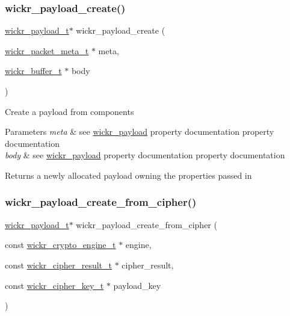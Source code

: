 \subsubsection{\texorpdfstring{wickr\+\_\+payload\+\_\+create()}{wickr\_payload\_create()}}
{\footnotesize\ttfamily \mbox{\hyperlink{structwickr__payload}{wickr\+\_\+payload\+\_\+t}}$\ast$ wickr\+\_\+payload\+\_\+create (\begin{DoxyParamCaption}\item[{\mbox{\hyperlink{structwickr__packet__meta}{wickr\+\_\+packet\+\_\+meta\+\_\+t}} $\ast$}]{meta,  }\item[{\mbox{\hyperlink{structwickr__buffer}{wickr\+\_\+buffer\+\_\+t}} $\ast$}]{body }\end{DoxyParamCaption})}

Create a payload from components


\begin{DoxyParams}{Parameters}
{\em meta} & see \textquotesingle{}\mbox{\hyperlink{structwickr__payload}{wickr\+\_\+payload}}\textquotesingle{} property documentation property documentation \\
\hline
{\em body} & see \textquotesingle{}\mbox{\hyperlink{structwickr__payload}{wickr\+\_\+payload}}\textquotesingle{} property documentation property documentation \\
\hline
\end{DoxyParams}
\begin{DoxyReturn}{Returns}
a newly allocated payload owning the properties passed in 
\end{DoxyReturn}
\mbox{\label{group__wickr__protocol_gaeeebf95ba580b92254a91009245028ee}} 
\subsubsection{\texorpdfstring{wickr\+\_\+payload\+\_\+create\+\_\+from\+\_\+cipher()}{wickr\_payload\_create\_from\_cipher()}}
{\footnotesize\ttfamily \mbox{\hyperlink{structwickr__payload}{wickr\+\_\+payload\+\_\+t}}$\ast$ wickr\+\_\+payload\+\_\+create\+\_\+from\+\_\+cipher (\begin{DoxyParamCaption}\item[{const \mbox{\hyperlink{structwickr__crypto__engine}{wickr\+\_\+crypto\+\_\+engine\+\_\+t}} $\ast$}]{engine,  }\item[{const \mbox{\hyperlink{structwickr__cipher__result}{wickr\+\_\+cipher\+\_\+result\+\_\+t}} $\ast$}]{cipher\+\_\+result,  }\item[{const \mbox{\hyperlink{structwickr__cipher__key}{wickr\+\_\+cipher\+\_\+key\+\_\+t}} $\ast$}]{payload\+\_\+key }\end{DoxyParamCaption})}

